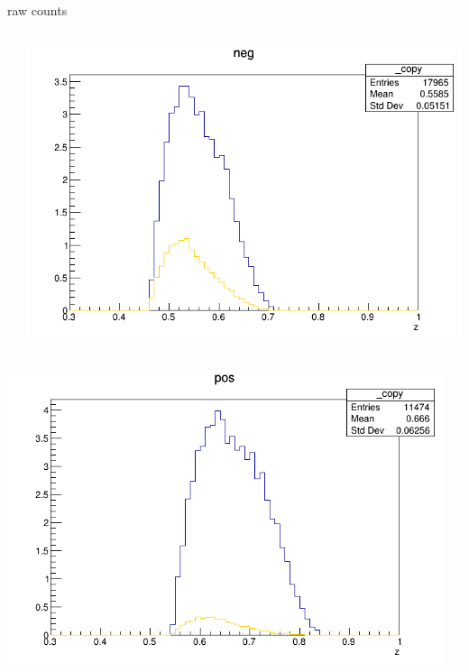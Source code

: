 \begin{frame}{raw counts}
\begin{columns}
\begin{column}[T]{0.25\textwidth}
\end{column}
\begin{column}[T]{0.25\textwidth}
\includegraphics[width = \textwidth]{results/yield/statistics/yield_x_Q2_z_0.55_5.500_0.55_neg.png}
\end{column}
\end{columns}
\begin{columns}
\begin{column}[T]{0.25\textwidth}
\includegraphics[width = \textwidth]{results/yield/statistics/yield_x_Q2_z_0.55_5.500_0.65_pos.png}
\end{column}
\begin{column}[T]{0.25\textwidth}

\end{column}
\end{columns}
\end{frame}
